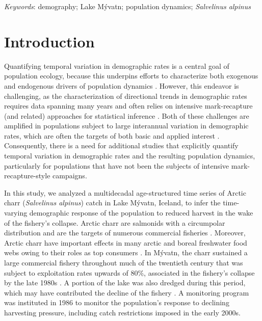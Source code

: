 \documentclass[11pt]{article}
\begin{document}
\bigskip

\textit{Keywords}: {demography; Lake M\'{y}vatn; population dynamics; \emph{Salvelinus alpinus}}

\clearpage




\section*{Introduction}

Quantifying temporal variation in demographic rates is a central goal of population ecology,
because this underpins efforts to characterize both exogenous and 
endogenous drivers of population dynamics 
\citep{twombly1994comparative, zeng1998, koons2016life}.
However, this endeavor is challenging, 
as the characterization of directional trends in demographic rates requires
data spanning many years and 
often relies on intensive mark-recapture (and related) approaches for statistical inference
\citep[e.g.,][]{forcada2008life, hunter2010climate}.
Both of these challenges are amplified in populations subject to large interannual variation
in demographic rates, 
which are often the targets of both basic and applied interest
\citep[e.g.,][]{white2007irruptive}.
Consequently, 
there is a need for additional studies that 
explicitly quantify temporal variation in demographic rates 
and the resulting population dynamics, 
particularly for populations that have not been the subjects 
of intensive mark-recapture-style campaigns.

In this study, we analyzed a multidecadal age-structured time series 
of Arctic charr (\emph{Salvelinus alpinus}) catch  in Lake M\'{y}vatn, Iceland, 
to infer the time-varying demographic response of the population 
to reduced harvest in the wake of the fishery's collapse.
Arctic charr are salmonids with a circumpolar distribution
and are the targets of 
numerous commercial fisheries \citep{klemetsen2003atlantic}.
Moreover,
Arctic charr have important effects in many arctic 
and boreal freshwater food webs owing to their roles as top consumers
\citep{jeppesen2001fish, klemetsen2003atlantic}.
In M\'{y}vatn, the charr sustained a large commercial fishery throughout much of the 
twentieth century that was subject to exploitation rates upwards of 80\%,
associated in the fishery's collapse by the late 1980s \citep{gudbergsson2004}.
A portion of the lake was also dredged during this period,
which may have contributed the decline of the fishery \citep{einarsson2004myvatn}.
A monitoring program was instituted in 1986 to monitor the population's
response to declining harvesting pressure,
including catch restrictions imposed in the early 2000s.
\end{document}
